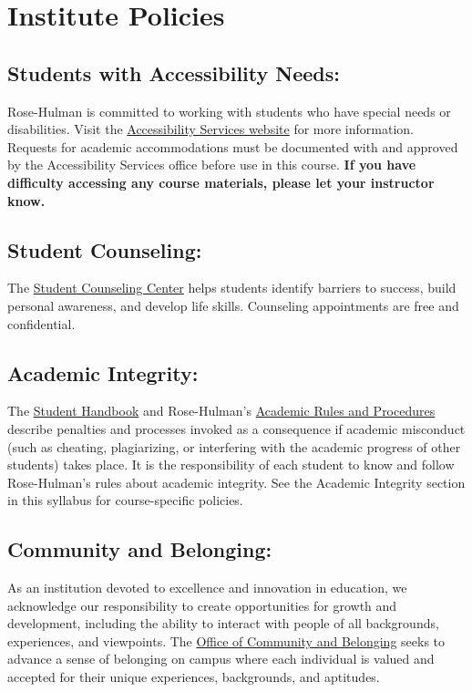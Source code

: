 \section*{Institute Policies}
\subsection*{Students with Accessibility Needs:}
Rose-Hulman is committed to working with students 
who have special needs or disabilities. 
Visit the \href{https://rosehulman.sharepoint.com/sites/sas/SitePages/Home.aspx}{Accessibility Services website}
for more information.  
Requests for academic accommodations must be 
documented with and approved by the Accessibility Services office 
before use in this course. 
\textbf{If you have difficulty accessing any course materials, 
please let your instructor know.}

\subsection*{Student Counseling:} 
The \href{https://rosehulman.sharepoint.com/sites/counseling/SitePages/Home.aspx}{Student Counseling Center} 
helps students identify barriers to success, 
build personal awareness, and develop life skills.  
Counseling appointments are free and confidential. 

\subsection*{Academic Integrity:} 
The \href{https://www.rose-hulman.edu/campus-life/student-life/_assets/Student-Handbook.pdf}{Student Handbook} 
and Rose-Hulman's \href{https://www.rose-hulman.edu/campus-life/student-services/registrar/rules-and-procedures/index.html}{Academic Rules and Procedures} 
describe penalties and processes invoked as a consequence 
if academic misconduct (such as cheating, plagiarizing, 
or interfering with the academic progress of other students) takes place. 
It is the responsibility of each student to know and follow Rose-Hulman's rules about academic integrity. 
See the Academic Integrity section in this syllabus for course-specific policies. 

\subsection*{Community and Belonging:}
As an institution devoted to excellence and innovation in education, 
we acknowledge our responsibility to create 
opportunities for growth and development, 
including the ability to interact with people 
of all backgrounds, experiences, and viewpoints. 
The \href{https://www.rose-hulman.edu/campus-life/student-services/office-community-belonging/index.html}{Office of Community and Belonging} 
seeks to advance a sense of belonging on campus where 
each individual is valued and accepted for 
their unique experiences, backgrounds, and aptitudes. 

